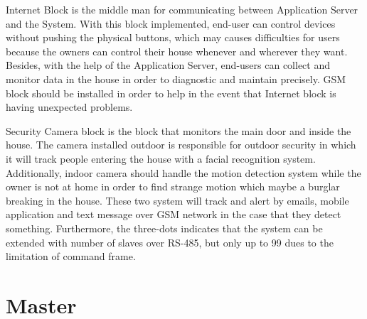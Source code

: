     Internet Block is the middle man for communicating between Application Server and the System. With this block implemented, end-user can control devices without pushing the physical buttons, which may causes difficulties for users because the owners can control their house whenever and wherever they want. Besides, with the help of the Application Server, end-users can collect and monitor data in the house in order to diagnostic and maintain precisely. GSM block should be installed in order to help in the event that Internet block is having unexpected problems.

    Security Camera block is the block that monitors the main door and inside the house. The camera installed outdoor is responsible for outdoor security in which it will track people entering the house with a facial recognition system. Additionally, indoor camera should handle the motion detection system while the owner is not at home in order to find strange motion which maybe a burglar breaking in the house. These two system will track and alert by emails, mobile application and text message over GSM network in the case that they detect something. Furthermore, the three-dots indicates that the system can be extended with number of slaves over RS-485, but only up to 99 dues to the limitation of command frame.
\section{Master}
